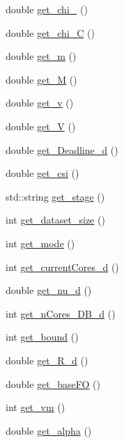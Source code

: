 \begin{DoxyCompactItemize}
double \hyperlink{classApplication_aabe1bfd32595da63199c745ed8736e6c}{get\-\_\-chi\-\_} ()
\item 
double \hyperlink{classApplication_a83fd92829139ab7fcac7b84bd765e7c2}{get\-\_\-chi\-\_\-\-C} ()
\item 
double \hyperlink{classApplication_a9ffe20e49ac2220e937c9133ea676c93}{get\-\_\-m} ()
\item 
double \hyperlink{classApplication_afd6fb36e7d3080e7cf479ec57bf511d8}{get\-\_\-\-M} ()
\item 
double \hyperlink{classApplication_a769241efad622861b4d177b6cef95afb}{get\-\_\-v} ()
\item 
double \hyperlink{classApplication_aabc164f25c55cdb78cccb9441b5a3952}{get\-\_\-\-V} ()
\item 
double \hyperlink{classApplication_a67f6af018dd1e4774e01c38d3c933ece}{get\-\_\-\-Deadline\-\_\-d} ()
\item 
double \hyperlink{classApplication_ac0f748455a140ca52bf09759ade0842d}{get\-\_\-csi} ()
\item 
std\-::string \hyperlink{classApplication_a140b3eeddfcf31a29b477301f37c5ad0}{get\-\_\-stage} ()
\item 
int \hyperlink{classApplication_a03c830382c61d8383a86f011883138ec}{get\-\_\-dataset\-\_\-size} ()
\item 
int \hyperlink{classApplication_a4ad44dc9971608e01a81164c13f2d73e}{get\-\_\-mode} ()
\item 
int \hyperlink{classApplication_a1a87d8c2de9650b2fa3e7b3f64857dd1}{get\-\_\-current\-Cores\-\_\-d} ()
\item 
double \hyperlink{classApplication_aa6b441c3147aec3aa0192d2e9f76251d}{get\-\_\-nu\-\_\-d} ()
\item 
int \hyperlink{classApplication_a97149e55a340940c15d56be4fb577767}{get\-\_\-n\-Cores\-\_\-\-D\-B\-\_\-d} ()
\item 
int \hyperlink{classApplication_afe686f73d03090e8e179704df91a0b2b}{get\-\_\-bound} ()
\item 
double \hyperlink{classApplication_ad0d83c496de2ca9268bb4d3f743dacac}{get\-\_\-\-R\-\_\-d} ()
\item 
double \hyperlink{classApplication_affaab47de2a18e0dc08c7a6bcd272c5a}{get\-\_\-base\-F\-O} ()
\item 
int \hyperlink{classApplication_a5d59e42d6f67c8f519d4c14df49e82a6}{get\-\_\-vm} ()
\item 
double \hyperlink{classApplication_a0bb182c29dbaf5293a120bdced8d08b6}{get\-\_\-alpha} ()
\item 

\end{DoxyCompactItemize}
